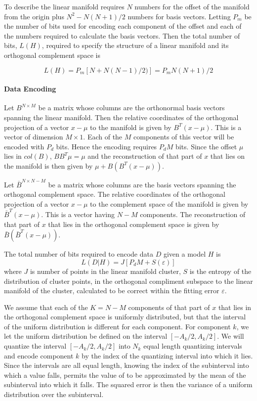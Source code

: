 To describe the linear manifold requires $N$ numbers for the offset of
the manifold from the origin plus $N^2 - N(N+1)/2$ numbers for basis vectors.
Letting $P_m$ be the number of bits used for encoding each component of
the offset and each of the numbers required to calculate the basis vectors.
Then the total number of bits, $L(H)$, required to specify the structure of
a linear manifold and its orthogonal complement space is

\begin{equation} \label{eq:mdl-lmc-model}
L(H) = P_m [ N + N(N-1)/2) ] = P_m N(N+1)/2
\end{equation}

\paragraph{Data Encoding}

Let $B^{N\times M}$ be a matrix whose columns are the orthonormal basis vectors
spanning the linear manifold. Then the relative coordinates of the orthogonal
projection of a vector $x-\mu$ to the manifold is given by $B^T (x-\mu)$.
This is a vector of dimension $M\times 1$. Each of the $M$ components of this
vector will be encoded with $P_d$ bits.
{
Hence the encoding requires $P_d M$ bits.
Since the offset $\mu$ lies in $col(B)$, $BB^T \mu = \mu$ and
the reconstruction of that part of $x$ that lies on the manifold is then given
by $\mu+B(B^T(x-\mu))$.
}

Let $\bar B^{N\times N-M}$ be a matrix whose columns are the basis vectors
spanning the orthogonal complement space. The relative coordinates of
the orthogonal projection of a vector $x-\mu$ to the complement space of
the manifold is given by $\bar B^T (x-\mu)$. This is a vector having $N-M$
components. The reconstruction of that part of $x$ that lies in the orthogonal
complement space is given by $\bar B(\bar B^T(x-\mu))$.

The total number of bits required to encode data $D$ given a model $H$ is
\begin{equation} \label{eq:mdl-lmc-data}
L(D|H) = J [P_d M + S(\varepsilon)]
\end{equation}
where $J$ is number of points in the linear manifold cluster, $S$ is the entropy
of the distribution of cluster points, in the orthogonal compliment subspace to
the linear manifold of the cluster, calculated to be correct within
the fitting error $\varepsilon$.

We assume that each of the $K=N-M$ components of that part of $x$ that lies in
the orthogonal complement space is uniformly distributed, but that the interval
of the uniform distribution is different for each component. For component $k$,
we let the uniform distribution be defined on the interval $[-A_k/2,A_k/2]$.
We will quantize the interval $[-A_k/2,A_k/2]$ into $N_k$ equal length
quantizing intervals and encode component $k$ by the index of the quantizing
interval into which it lies.
Since the intervals are all equal length, knowing the index of the subinterval
into which a value falls, permits the value of to be approximated by the mean
of the subinterval into which it falls. The squared error is then the variance
of a uniform distribution over the subinterval.

